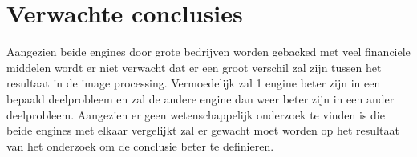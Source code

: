 \section{Verwachte conclusies}
\label{sec:verwachte_conclusies}
Aangezien beide engines door grote bedrijven worden gebacked met veel financiele middelen wordt er niet verwacht dat er een groot verschil zal zijn tussen het resultaat in de image processing. Vermoedelijk zal 1 engine beter zijn in een bepaald deelprobleem en zal de andere engine dan weer beter zijn in een ander deelprobleem.
Aangezien er geen wetenschappelijk onderzoek te vinden is die beide engines met elkaar vergelijkt zal er gewacht moet worden op het resultaat van het onderzoek om de conclusie beter te definieren.

